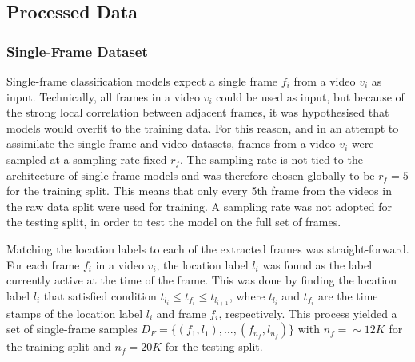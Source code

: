 \documentclass[a4paper]{article}
\begin{document}

\subsection{Processed Data} %
\label{sub:processed-data}

\subsubsection{Single-Frame Dataset} %

Single-frame classification models expect a single frame $f_i$ from a video
$v_i$ as input. Technically, all frames in a video $v_i$ could be used as input,
but because of the strong local correlation between adjacent frames, it was
hypothesised that models would overfit to the training data. For this reason,
and in an attempt to assimilate the single-frame and video datasets, frames from
a video $v_i$ were sampled at a sampling rate fixed $r_f$. The sampling rate is
not tied to the architecture of single-frame models and was therefore chosen
globally to be $r_f=5$ for the training split. This means that only every 5th
frame from the videos in the raw data split were used for training. A sampling
rate was not adopted for the testing split, in order to test the model on the
full set of frames.

Matching the location labels to each of the extracted frames was
straight-forward. For each frame $f_i$ in a video $v_i$, the location label
$l_i$ was found as the label currently active at the time of the frame. This was
done by finding the location label $l_i$ that satisfied condition $t_{l_i} \leq
t_{f_i} \leq t_{l_{i+1}}$, where $t_{l_i}$ and $t_{f_i}$ are the time stamps of
the location label $l_i$ and frame $f_i$, respectively. This process yielded a
set of single-frame samples $D_F = \{(f_1, l_1), ..., (f_{n_f}, l_{n_f})\}$ with
$n_f=\sim 12K$ for the training split and $n_f=20K$ for the testing split.
\end{document}
